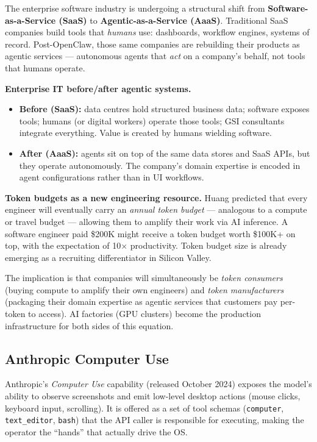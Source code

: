 The enterprise software industry is undergoing a structural shift from
\textbf{Software-as-a-Service (SaaS)} to \textbf{Agentic-as-a-Service (AaaS)}.
Traditional SaaS companies build tools that \emph{humans} use: dashboards, workflow
engines, systems of record. Post-OpenClaw, those same companies are rebuilding their
products as agentic services --- autonomous agents that \emph{act} on a company's behalf,
not tools that humans operate.

\textbf{Enterprise IT before/after agentic systems.}
\begin{itemize}
  \item \textbf{Before (SaaS):} data centres hold structured business data; software
    exposes tools; humans (or digital workers) operate those tools; GSI consultants
    integrate everything. Value is created by humans wielding software.
  \item \textbf{After (AaaS):} agents sit on top of the same data stores and SaaS
    APIs, but they operate autonomously. The company's domain expertise is encoded in
    agent configurations rather than in UI workflows.
\end{itemize}

\textbf{Token budgets as a new engineering resource.} Huang predicted that every
engineer will eventually carry an \emph{annual token budget} --- analogous to a compute
or travel budget --- allowing them to amplify their work via AI inference. A software
engineer paid \$200K might receive a token budget worth \$100K+ on top, with the
expectation of 10$\times$ productivity. Token budget size is already emerging as a
recruiting differentiator in Silicon Valley.

\begin{notebox}
  The implication is that companies will simultaneously be \emph{token consumers}
  (buying compute to amplify their own engineers) and \emph{token manufacturers}
  (packaging their domain expertise as agentic services that customers pay per-token
  to access). AI factories (GPU clusters) become the production infrastructure for
  both sides of this equation.
\end{notebox}

\subsection{Anthropic Computer Use}

Anthropic's \emph{Computer Use} capability (released October 2024) exposes the model's
ability to observe screenshots and emit low-level desktop actions (mouse clicks, keyboard
input, scrolling). It is offered as a set of tool schemas (\texttt{computer},
\texttt{text\_editor}, \texttt{bash}) that the API caller is responsible for executing,
making the operator the ``hands'' that actually drive the OS.

